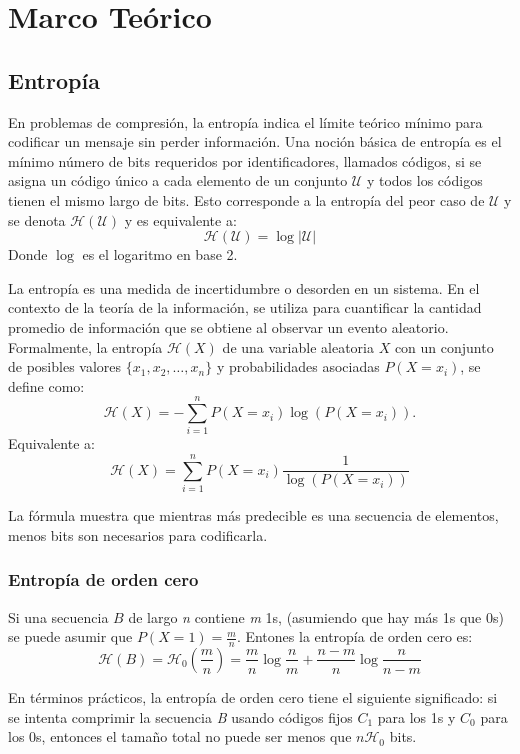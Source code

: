\chapter{Marco Teórico}\label{chap:marco-teorico}

\section{Entropía}

En problemas de compresión, la entropía indica el límite teórico mínimo para codificar un mensaje sin perder información. Una noción básica de entropía es el mínimo número de bits requeridos por identificadores, llamados códigos, si se asigna un código único a cada elemento de un conjunto $\mathcal{U}$ y todos los códigos tienen el mismo largo de bits. Esto corresponde a la entropía del peor caso de $\mathcal{U}$ y se denota $\mathcal{H}(\mathcal{U})$ y es equivalente a:
\[
\mathcal{H}(\mathcal{U}) = \log  |\mathcal{U}| 
\]
Donde $\log$ es el logaritmo en base 2.

La entropía es una medida de incertidumbre o desorden en un sistema. En el contexto de la teoría de la información, se utiliza para cuantificar la cantidad promedio de información que se obtiene al observar un evento aleatorio. Formalmente, la entropía $\mathcal{H}(X)$ de una variable aleatoria $X$ con un conjunto de posibles valores $\{x_1, x_2, \ldots, x_n\}$ y probabilidades asociadas $P(X=x_i)$, se define como:
\[
\mathcal{H}(X) = - \sum_{i=1}^n P(X=x_i) \log(P(X=x_i)).
\]
Equivalente a:
\[
\mathcal{H}(X) = \sum_{i=1}^n P(X=x_i) \frac{1}{\log(P(X=x_i))}
\]

La fórmula muestra que mientras más predecible es una secuencia de elementos, menos bits son necesarios para codificarla.

\subsection{Entropía de orden cero}
Si una secuencia $B$ de largo \textit{n} contiene \textit{m} 1s, (asumiendo que hay más 1s que 0s) se puede asumir que $P(X=1) = \frac{m}{n}$. Entones la entropía de orden cero es:
\[
\mathcal{H}(B) = \mathcal{H}_0(\frac{m}{n}) = \frac{m}{n}\log{\frac{n}{m}} + \frac{n-m}{n}\log{\frac{n}{n-m}}
\]

En términos prácticos, la entropía de orden cero tiene el siguiente significado: si se intenta comprimir la secuencia \textit{B} usando códigos fijos $C_1$ para los 1s y $C_0$ para los 0s, entonces el tamaño total no puede ser menos que $n \mathcal{H}_0 $ bits.

